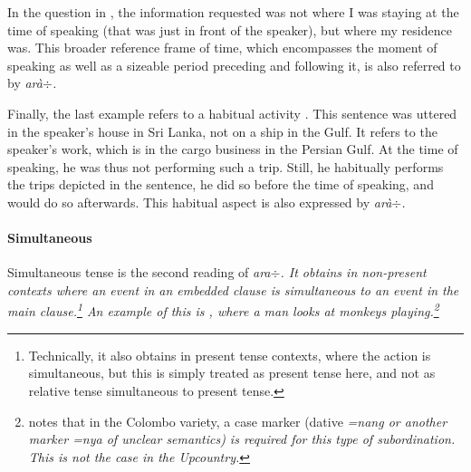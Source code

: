 

In the question in , the information requested was not where I was staying at the time of speaking (that was just in front of the speaker), but where my residence was. This broader reference frame of time, which encompasses the moment of speaking as well as a sizeable period preceding and following it, is also referred to by \em arà$\div$\em.



Finally, the last example refers to a habitual activity \citep[cf.][]{Ansaldo2009book}. This sentence was uttered in the speaker's house in Sri Lanka, not on a ship in the Gulf. It refers to the speaker's work, which is in the cargo business in the Persian Gulf. At the time of speaking, he was thus not performing such a trip. Still, he habitually performs the trips depicted in the sentence, he did so before the time of speaking, and would do so afterwards. This habitual aspect is also expressed by \em arà$\div$\em.

\paragraph{Simultaneous}
Simultaneous tense  is the second reading of \em ara$\div$\em. It obtains in non-present contexts where an event in an embedded clause is simultaneous to an event in the main clause.\footnote{Technically, it also obtains in present tense contexts, where the action is simultaneous, but this is simply treated as present tense here, and not as relative tense simultaneous to present tense.} An example of this is , where a man looks at  monkeys playing.\footnote{\citet[147]{Slomanson2006cll} notes that in the Colombo variety, a case marker (dative \em =nang \em or another marker \em =nya \em of unclear semantics) is required for this type of subordination. This is not the case in the Upcountry.}


